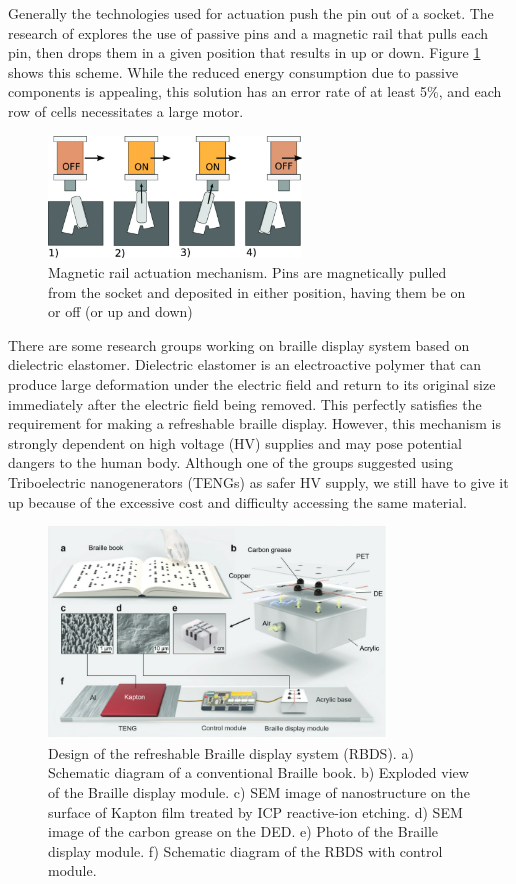 Generally the technologies used for actuation push the pin out of a socket.
The research of \cite{loconsole_braillecursor_2019} explores the use of passive pins and a magnetic rail that pulls each pin, then drops them in a given position that results in up or down. Figure \ref{fig:magnetic-rail} shows this scheme.
While the reduced energy consumption due to passive components is appealing, this solution has an error rate of at least 5\%, and each row of cells necessitates a large motor.
\begin{figure}
\centering
    \includegraphics[width=0.6\textwidth]{figures/magnetic-rail.jpg}
\caption{Magnetic rail actuation mechanism. Pins are magnetically pulled from the socket and deposited in either position, having them be on or off (or up and down)}
\label{fig:magnetic-rail}
\end{figure}  

There are some research groups working on braille display system based on dielectric elastomer. Dielectric elastomer is an electroactive polymer that can produce large deformation under the electric field and return to its original size immediately after the electric field being removed. This perfectly satisfies the requirement for making a refreshable braille display. However, this mechanism is strongly dependent on high voltage (HV) supplies and may pose potential dangers to the human body. Although one of the groups suggested using Triboelectric nanogenerators (TENGs) as safer HV supply, we still have to give it up because of the excessive cost and difficulty accessing the same material. 

\begin{figure}\centering
    \includegraphics[width=0.8\textwidth]{figures/teng.png}
\caption{Design of the refreshable Braille display system (RBDS). a) Schematic diagram of a conventional Braille book. b) Exploded view of the Braille display module. c) SEM image of nanostructure on the surface of Kapton film treated by ICP reactive-ion etching. d) SEM image of the carbon grease on the DED. e) Photo of the Braille display module. f) Schematic diagram of the RBDS with control module.}
\label{fig:teng.png}
\end{figure}

